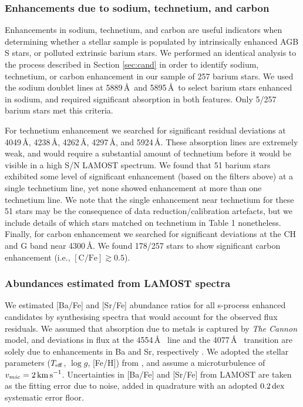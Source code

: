 \documentclass[a4paper,fleqn,usenatbib]{mnras}
\begin{document}
\subsubsection{Enhancements due to sodium, technetium, and carbon} \label{sec:other enhancements}
Enhancements in sodium, technetium, and carbon are useful indicators when determining whether a stellar sample is populated by intrinsically enhanced AGB S stars, or polluted extrinsic barium stars. We performed an identical analysis to the process described in Section \ref{sec:cand} in order to identify sodium, technetium, or carbon enhancement in our sample of 257 barium stars. We used the sodium doublet lines at 5889\,\AA\ and 5895\,\AA\ to select barium stars enhanced in sodium, and required significant absorption in both features. Only 5/257 barium stars met this criteria.

For technetium enhancement we searched for significant residual deviations at 4049\,\AA, 4238\,\AA, 4262\,\AA, 4297\,\AA, and 5924\,\AA. These absorption lines are extremely weak, and would require a substantial amount of technetium before it would be visible in a high S/N LAMOST spectrum. We found that 51 barium stars exhibited some level of significant enhancement (based on the filters above) at a single technetium line, yet none showed enhancement at more than one technetium line. We note that the single enhancement near technetium for these 51 stars may be the consequence of data reduction/calibration artefacts, but we include details of which stars matched on technetium in Table 1 nonetheless.
Finally, for carbon enhancement we searched for significant deviations at the CH and G band near 4300\,\AA. We found 178/257 stars to show significant carbon enhancement (i.e., $[\textrm{C/Fe}] \gtrsim 0.5$). 

\subsubsection{Abundances estimated from LAMOST spectra}
We estimated [Ba/Fe] and [Sr/Fe] abundance ratios for all s-process enhanced candidates by synthesising spectra that would account for the observed flux residuals. We assumed that absorption due to metals is captured by \emph{The Cannon} model, and deviations in flux at the 4554\,\AA\  line and the 4077\,\AA\  transition are solely due to enhancements in Ba and Sr, respectively \citep{marcs,sme,vald,ispec}. We adopted the stellar parameters ($T_{\rm eff}$, $\log{g}$, [Fe/H]) from \citet{ho2017}, and assume a microturbulence of $v_{mic} = 2\,{\rm km\,s}^{-1}$. Uncertainties in [Ba/Fe] and [Sr/Fe] from LAMOST are taken as the fitting error due to noise, added in quadrature with an adopted $0.2\,{\rm dex}$ systematic error floor.
\end{document}
